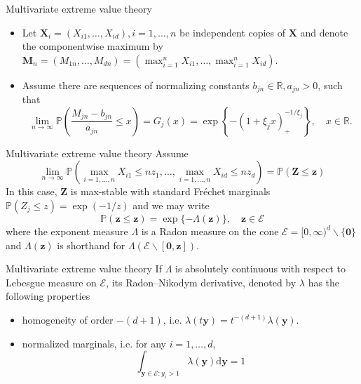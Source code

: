 \documentclass[11pt]{beamer}
\newcommand{\bX}{\boldsymbol{X}}
\newcommand{\by}{\boldsymbol{y}}
\newcommand{\bZ}{\boldsymbol{Z}}
\newcommand{\bz}{\boldsymbol{z}}
\begin{document}
\begin{frame}{Multivariate extreme value theory}\
\begin{itemize}
\item Let $\bX_{i}=\left(X_{i 1}, \ldots, X_{i d}\right), i=1, \ldots, n$ be independent copies of $\bX$ and denote the componentwise maximum by $\mathbf{M}_{n}=\left(M_{1 n}, \ldots, M_{d n}\right)=\left(\max _{i=1}^{n} X_{i 1}, \ldots, \max _{i=1}^{n} X_{i d}\right)$.
\item Assume there are sequences of normalizing constants $b_{jn}\in \mathbb{R},a_{jn}>0$, such that
$$
\lim _{n \rightarrow \infty} \mathbb{P}\left(\frac{M_{j n}-b_{j n}}{a_{j n}} \leqslant x\right)=G_{j}(x)=\exp \left\{-\left(1+\xi_{j} x\right)_{+}^{-1 / \xi_{j}}\right\}, \quad x \in \mathbb{R}.
$$
\end{itemize}
\end{frame}


\begin{frame}{Multivariate extreme value theory}
Assume
$$
\lim _{n \rightarrow \infty} \mathbb{P}\left(\max _{i=1, \ldots, n} X_{i 1} \leqslant n z_{1}, \ldots, \max _{i=1, \ldots, n} X_{i d} \leqslant n z_{d}\right)=\mathbb{P}(\bZ \leqslant \bz)
$$
In this case, $\bZ$ is max-stable with standard Fr\'echet marginals $\mathbb{P}(Z_j\le z)=\exp(-1/z)$ and we may write
$$
\mathbb{P}(\bz \leqslant \bz)=\exp \{-\Lambda(\bz)\}, \quad \bz \in \mathcal{E}
$$
where the exponent measure $\Lambda$ is a Radon measure on the cone $\mathcal{E}=[0, \infty)^{d} \backslash\{\boldsymbol{0}\}$ and $\Lambda(\bz)$ is shorthand for $\Lambda(\mathcal{E} \backslash[\mathbf{0}, \bz])$.
\end{frame}


\begin{frame}{Multivariate extreme value theory}
If $\Lambda$ is absolutely continuous with respect to Lebesgue measure on $\mathcal{E}$,  its Radon–Nikodym derivative, denoted by $\lambda$ has the following properties
\begin{itemize}
\item homogeneity of order $-(d+1)$, i.e. $\lambda(t\by)=t^{-(d+1)}\lambda(\by)$.
\item normalized marginals, i.e. for any $i=1,\dots,d$,
$$
\int_{\mathbf{y} \in \mathcal{E}: y_{i}>1} \lambda(\by) \mathrm{d} \by=1
$$
\end{itemize}
\end{frame}
\end{document}
